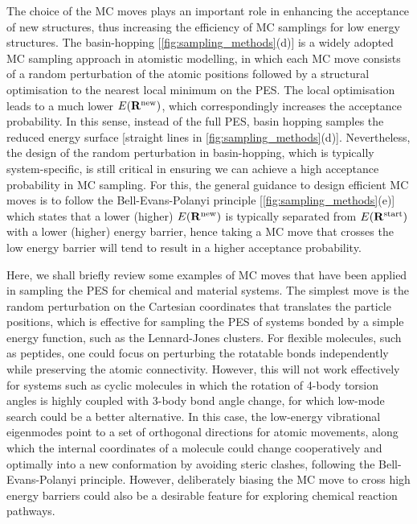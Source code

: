  The choice of the MC  moves plays an important role in enhancing the acceptance of new structures, thus increasing the efficiency of MC samplings for low energy structures. The basin-hopping\cite{wales1997global,wales1998global} [\cref{fig:sampling_methods}(d)] is  a widely adopted MC sampling approach in atomistic modelling, in which each MC move consists of a random perturbation of the atomic positions followed by a structural optimisation to the nearest local minimum on the PES. The local optimisation leads to a much lower $E(\mathbf{R}^{\mbox{\scriptsize{new}}})$, which correspondingly increases the acceptance probability. In this sense, instead of the full PES, basin hopping samples the reduced energy surface [straight lines in \cref{fig:sampling_methods}(d)]. Nevertheless, the design of the random perturbation in basin-hopping, which is typically system-specific, is still critical in ensuring we can achieve a high acceptance probability in MC sampling.  For this, the general guidance to design efficient MC moves is to follow the Bell-Evans-Polanyi principle\cite{bell1936theory,evans1938inertia} [\cref{fig:sampling_methods}(e)] which states that a lower (higher) $E(\mathbf{R}^{\mbox{\scriptsize{new}}})$ is typically separated from $E(\mathbf{R}^{\mbox{\scriptsize{start}}})$ with a lower (higher) energy barrier, hence taking a MC move that crosses the low energy barrier will tend to result in a higher acceptance probability. 

Here, we shall briefly review some examples of MC moves that have been applied in sampling the PES for chemical and material systems. The simplest move is the random perturbation on the Cartesian coordinates that translates the particle positions, which is effective for sampling the PES of systems bonded by a simple energy function, such as the Lennard-Jones clusters.\cite{wales1997global,wales1998global}  For flexible molecules, such as peptides, one could focus on perturbing the rotatable bonds independently while preserving the atomic connectivity.\cite{echenique2006definition} However, this will not work effectively for systems such as cyclic molecules in which the rotation of 4-body torsion angles is highly coupled with 3-body bond angle change, for which low-mode search\cite{kolossvary1996low} could be a better alternative. In this case, the low-energy vibrational eigenmodes  point to a set of orthogonal directions for atomic movements, along which the internal coordinates of a molecule could change cooperatively and optimally into a new conformation by avoiding steric clashes, following the Bell-Evans-Polanyi principle. However, deliberately biasing the MC move to cross high energy barriers could also be a desirable feature for exploring chemical reaction pathways. \cite{shang2013stochastic} 

